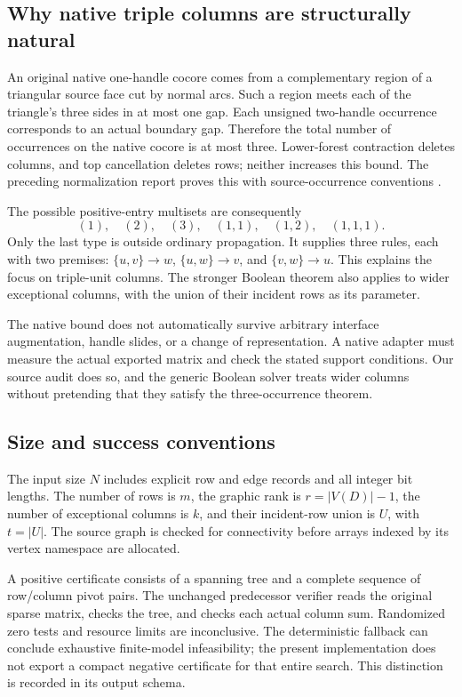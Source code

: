 \subsection{Why native triple columns are structurally natural}

An original native one-handle cocore comes from a complementary region of
a triangular source face cut by normal arcs.  Such a region meets each of
the triangle's three sides in at most one gap.  Each unsigned two-handle
occurrence corresponds to an actual boundary gap.  Therefore the total
number of occurrences on the native cocore is at most three.  Lower-forest
contraction deletes columns, and top cancellation deletes rows; neither
increases this bound.  The preceding normalization report proves this
with source-occurrence conventions \cite{IncomingForests2026}.

The possible positive-entry multisets are consequently
\[
(1),\quad(2),\quad(3),\quad(1,1),\quad(1,2),\quad(1,1,1).
\]
Only the last type is outside ordinary propagation.  It supplies three
rules, each with two premises: $\{u,v\}\to w$, $\{u,w\}\to v$, and
$\{v,w\}\to u$.  This explains the focus on triple-unit columns.  The
stronger Boolean theorem also applies to wider exceptional columns, with
the union of their incident rows as its parameter.

The native bound does not automatically survive arbitrary interface
augmentation, handle slides, or a change of representation.  A native
adapter must measure the actual exported matrix and check the stated
support conditions.  Our source audit does so, and the generic Boolean
solver treats wider columns without pretending that they satisfy the
three-occurrence theorem.

\subsection{Size and success conventions}

The input size $N$ includes explicit row and edge records and all integer
bit lengths.  The number of rows is $m$, the graphic rank is
$r=|V(D)|-1$, the number of exceptional columns is $k$, and their incident-row
union is $U$, with $t=|U|$.  The source graph is checked for connectivity
before arrays indexed by its vertex namespace are allocated.

A positive certificate consists of a spanning tree and a complete sequence
of row/column pivot pairs.  The unchanged predecessor verifier reads the
original sparse matrix, checks the tree, and checks each actual column
sum.  Randomized zero tests and resource limits are inconclusive.  The
deterministic fallback can conclude exhaustive finite-model infeasibility;
the present implementation does not export a compact negative certificate
for that entire search.  This distinction is recorded in its output schema.
